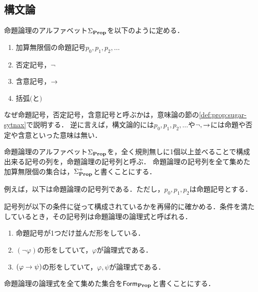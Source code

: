\subsection{構文論}

\begin{myDefinition}
  命題論理のアルファベット$\Sigma_{\mathbf{Prop}}$を以下のように定める．
  \begin{enumerate}
    \item 加算無限個の命題記号$p_0,p_1,p_2,\dots$
    \item 否定記号，$\neg$
    \item 含意記号，$\to$
    \item 括弧$($と$)$
  \end{enumerate}
\end{myDefinition}

\begin{myRemark}
  なぜ命題記号，否定記号，含意記号と呼ぶかは，意味論の節の\ref{def:prop:sugar-sytnax}で説明する．
  逆に言えば，構文論的には$p_0,p_1,p_2,\dots$や$\neg,\to$には命題や否定や含意といった意味は無い．
\end{myRemark}

\begin{myDefinition}[命題論理の記号列]
  命題論理のアルファベット$\Sigma_{\mathbf{Prop}}$を，全く規則無しに1個以上並べることで構成出来る記号の列を，命題論理の記号列と呼ぶ．
  命題論理の記号列を全て集めた加算無限個の集合は，$\Sigma_{\mathbf{Prop}}^+$と書くことにする．
\end{myDefinition}

\begin{myExample}[命題論理の記号列の例]
  例えば，以下は命題論理の記号列である．ただし，$p_0,p_1,p_2$は命題記号とする．
\end{myExample}

\begin{myDefinition}[命題論理の論理式]
  記号列が以下の条件に従って構成されているかを再帰的に確かめる．条件を満たしているとき，その記号列は命題論理の論理式と呼ばれる．
  \begin{enumerate}
    \item 命題記号が1つだけ並んだ形をしている．
    \item $(\neg \varphi)$の形をしていて，$\varphi$が論理式である．
    \item $(\varphi \to \psi)$の形をしていて，$\varphi, \psi$が論理式である．
  \end{enumerate}
  命題論理の論理式を全て集めた集合を$\mathsf{Form}_{\mathbf{Prop}}$と書くことにする．
\end{myDefinition}

